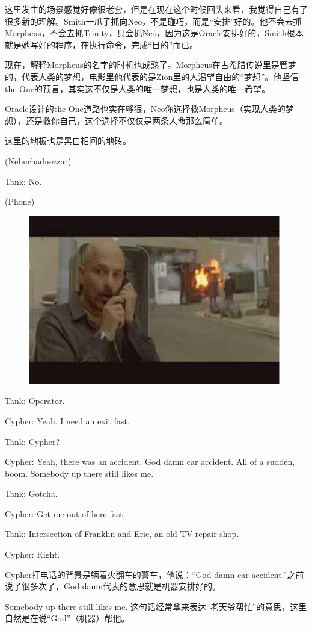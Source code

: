 \documentclass{ctexart}
\newenvironment{myquote}{\color{green} \setlength{\leftskip}{6em} \setlength{\rightskip}{4em} \setlength{\parindent}{-2em}}{\par}
\begin{document}
这里发生的场景感觉好像很老套，但是在现在这个时候回头来看，我觉得自己有了很多新的理解。Smith一爪子抓向Neo，不是碰巧，而是“安排”好的。他不会去抓Morpheus，不会去抓Trinity，只会抓Neo，因为这是Oracle安排好的，Smith根本就是她写好的程序，在执行命令，完成“目的”而已。

现在，解释Morpheus的名字的时机也成熟了。Morpheus在古希腊传说里是管梦的，代表人类的梦想，电影里他代表的是Zion里的人渴望自由的“梦想”。他坚信the One的预言，其实这不仅是人类的唯一梦想，也是人类的唯一希望。

Oracle设计的the One道路也实在够狠，Neo你选择救Morpheus（实现人类的梦想），还是救你自己，这个选择不仅仅是两条人命那么简单。

这里的地板也是黑白相间的地砖。

\begin{myquote}
(Nebuchadnezzar)

Tank: No.

(Phone)

\begin{figure}[htb]
\centering
\includegraphics[width=0.5\linewidth]{fig/read_Matrix-57}
\end{figure}

Tank: Operator.

Cypher: Yeah, I need an exit fast.

Tank: Cypher?

Cypher: Yeah, there was an accident. God damn car accident. All of a sudden, boom. Somebody up there still likes me.

Tank: Gotcha.

Cypher: Get me out of here fast.

Tank: Intersection of Franklin and Erie, an old TV repair shop.

Cypher: Right.
\end{myquote}

Cypher打电话的背景是辆着火翻车的警车，他说：“God damn car accident.”之前说了很多次了，God damn代表的意思就是机器安排好的。

Somebody up there still likes me. 这句话经常拿来表达“老天爷帮忙”的意思，这里自然是在说“God”（机器）帮他。
\end{document}
